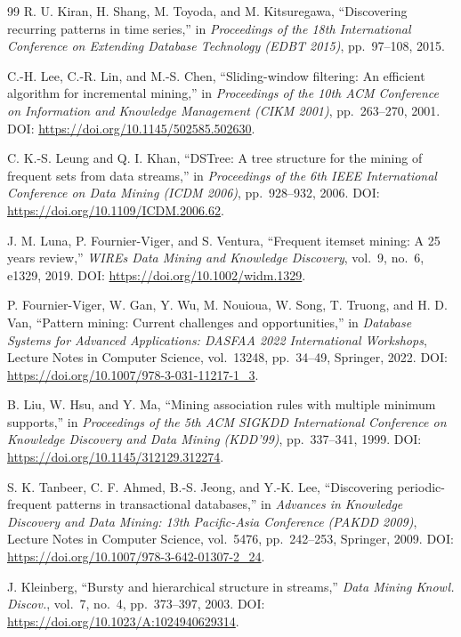 \documentclass[10pt,twocolumn]{AROB}
\begin{document}
\begin{thebibliography}{99}
R. U. Kiran, H. Shang, M. Toyoda, and M. Kitsuregawa,
``Discovering recurring patterns in time series,''
in \textit{Proceedings of the 18th International Conference on Extending Database Technology (EDBT 2015)},
pp.~97--108, 2015.

C.-H. Lee, C.-R. Lin, and M.-S. Chen,
``Sliding-window filtering: An efficient algorithm for incremental mining,''
in \textit{Proceedings of the 10th ACM Conference on Information and Knowledge Management (CIKM 2001)},
pp.~263--270, 2001. DOI: \url{https://doi.org/10.1145/502585.502630}.

C. K.-S. Leung and Q. I. Khan,
``DSTree: A tree structure for the mining of frequent sets from data streams,''
in \textit{Proceedings of the 6th IEEE International Conference on Data Mining (ICDM 2006)},
pp.~928--932, 2006. DOI: \url{https://doi.org/10.1109/ICDM.2006.62}.

J. M. Luna, P. Fournier-Viger, and S. Ventura,
``Frequent itemset mining: A 25 years review,''
{\it WIREs Data Mining and Knowledge Discovery}, vol.~9, no.~6, e1329, 2019.
DOI: \url{https://doi.org/10.1002/widm.1329}.

P. Fournier-Viger, W. Gan, Y. Wu, M. Nouioua, W. Song, T. Truong, and H. D. Van,
``Pattern mining: Current challenges and opportunities,''
in \textit{Database Systems for Advanced Applications: DASFAA 2022 International Workshops},
Lecture Notes in Computer Science, vol.~13248, pp.~34--49, Springer, 2022.
DOI: \url{https://doi.org/10.1007/978-3-031-11217-1_3}.

B. Liu, W. Hsu, and Y. Ma,
``Mining association rules with multiple minimum supports,''
in \textit{Proceedings of the 5th ACM SIGKDD International Conference on Knowledge Discovery and Data Mining (KDD'99)},
pp.~337--341, 1999. DOI: \url{https://doi.org/10.1145/312129.312274}.

S. K. Tanbeer, C. F. Ahmed, B.-S. Jeong, and Y.-K. Lee,
``Discovering periodic-frequent patterns in transactional databases,''
in \textit{Advances in Knowledge Discovery and Data Mining: 13th Pacific-Asia Conference (PAKDD 2009)},
Lecture Notes in Computer Science, vol.~5476, pp.~242--253, Springer, 2009.
DOI: \url{https://doi.org/10.1007/978-3-642-01307-2_24}.

J. Kleinberg,
``Bursty and hierarchical structure in streams,''
{\it Data Mining Knowl. Discov.}, vol.~7, no.~4, pp.~373--397, 2003.
DOI: \url{https://doi.org/10.1023/A:1024940629314}.


\end{thebibliography}
\end{document}
